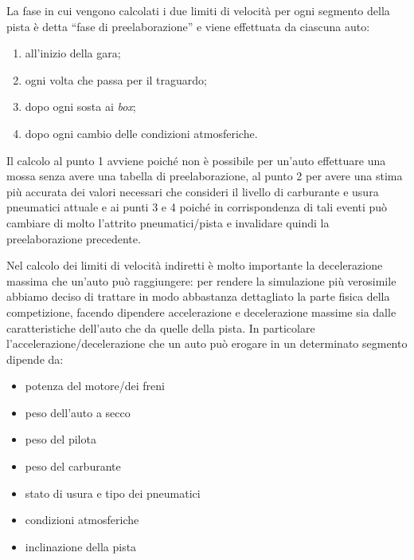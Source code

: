 \documentclass[11pt,a4paper]{report}
\begin{document}
La fase in cui vengono calcolati i due limiti di velocità per ogni segmento della pista è detta ``fase di preelaborazione'' e viene effettuata da ciascuna auto:
\begin{enumerate}
\item all'inizio della gara;
\item ogni volta che passa per il traguardo;
\item dopo ogni sosta ai \textit{box};
\item dopo ogni cambio delle condizioni atmosferiche.
\end{enumerate}
Il calcolo al punto 1 avviene poiché non è possibile per un'auto effettuare una mossa senza avere una tabella di preelaborazione, al punto 2 per avere una stima più accurata dei valori necessari che consideri il livello di carburante e usura pneumatici attuale e ai punti 3 e 4 poiché in corrispondenza di tali eventi può cambiare di molto l'attrito pneumatici/pista e invalidare quindi la preelaborazione precedente.

Nel calcolo dei limiti di velocità indiretti è molto importante la decelerazione massima che un'auto può raggiungere: per rendere la simulazione più verosimile abbiamo deciso di trattare in modo abbastanza dettagliato la parte fisica della competizione, facendo dipendere accelerazione e decelerazione massime sia dalle caratteristiche dell'auto che da quelle della pista.
In particolare l'accelerazione/decelerazione che un auto può erogare in un determinato segmento dipende da:
\begin{itemize}
\item potenza del motore/dei freni
\item peso dell'auto a secco
\item peso del pilota
\item peso del carburante
\item stato di usura e tipo dei pneumatici
\item condizioni atmosferiche
\item inclinazione della pista
\end{itemize}
\end{document}
